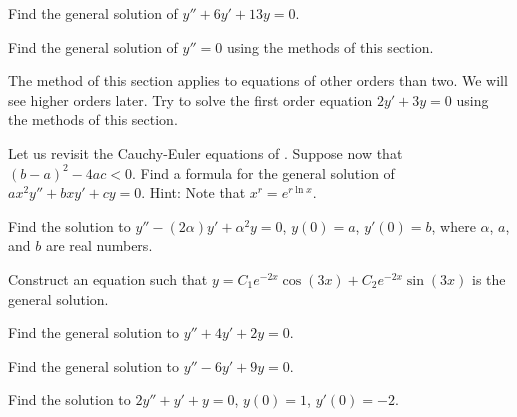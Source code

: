 \documentclass[12pt]{book}
\begin{document}
\begin{exercise}
Find the general solution of $y'' + 6 y' + 13 y = 0$.
\end{exercise}

\begin{exercise}
Find the general solution of $y'' = 0$ using the methods of this section.
\end{exercise}

\begin{exercise}
The method of this section applies to equations of other orders than two.
We will see
higher orders later.  Try to solve the first order equation
$2y' + 3y = 0$ using the methods of this section.
\end{exercise}

\begin{exercise}
Let us revisit the Cauchy-Euler equations of
.  Suppose now
that ${(b-a)}^2-4ac < 0$.  Find a formula for the general solution
of $a x^2 y'' + b x y' + c y = 0$.  Hint: Note that $x^r = e^{r \ln x}$.
\end{exercise}

\begin{exercise}
Find the solution to
$y''-(2\alpha) y' + \alpha^2 y=0$, $y(0) = a$, $y'(0)=b$,
where $\alpha$, $a$, and $b$ are real numbers.
\end{exercise}

\begin{exercise}
Construct an equation such that $y = C_1 e^{-2x} \cos(3x) + C_2 e^{-2x}
\sin(3x)$ is the general
solution.
\end{exercise}

\setcounter{exercise}{100}

\begin{exercise}
Find the general solution to
$y''+4y'+2y=0$.
\end{exercise}

\begin{exercise}
Find the general solution to
$y''-6y'+9y=0$.
\end{exercise}

\begin{exercise}
Find the solution to
$2y''+y'+y=0$, $y(0) = 1$, $y'(0)=-2$.
\end{exercise}
\end{document}
